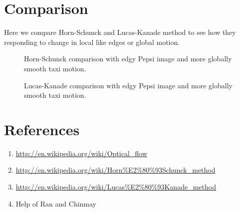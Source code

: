 \documentclass{article}
\begin{document}
\section{Comparison}
	Here we compare Horn-Schunck and Lucas-Kanade method to see how they responding to change in local like edges or global motion.
	
\begin{figure}[H]
\centering
{}
\caption{Horn-Schunck comparison with edgy Pepsi image and more globally smooth taxi motion.}	
\label{fig:ComparisonHS}
\end{figure}

\begin{figure}[H]
\centering
{}
\caption{Lucas-Kanade comparison with edgy Pepsi image and more globally smooth taxi motion.}	
\label{fig:ComparisonLK}
\end{figure}


\section{References}

\begin{enumerate}
	\item \url{http://en.wikipedia.org/wiki/Optical_flow}
	\item \url{http://en.wikipedia.org/wiki/Horn\%E2\%80\%93Schunck\_method}
	\item \url{http://en.wikipedia.org/wiki/Lucas\%E2\%80\%93Kanade_method}
	\item Help of Ran and Chinmay
\end{enumerate}
\end{document}
